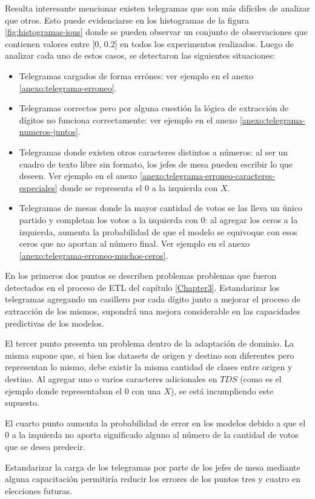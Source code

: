 Resulta interesante mencionar existen telegramas que son m\'as dif\'iciles de analizar que otros. Esto puede
evidenciarse en los histogramas de la figura \ref{fig:histogramas-ious} donde se pueden observar un conjunto de
observaciones que contienen valores entre [0, 0.2] en todos los experimentos realizados. Luego de analizar cada uno de
estos casos, se detectaron las siguientes situaciones:

\begin{itemize}
    \item Telegramas cargados de forma err\'ones: ver ejemplo en el anexo \ref{anexo:telegrama-erroneo}.
    \item Telegramas correctos pero por alguna cuesti\'on la l\'ogica de extracci\'on de d\'igitos no funciona correctamente: ver
          ejemplo en el anexo \ref{anexo:telegrama-numeros-juntos}.
    \item Telegramas donde existen otros caracteres distintos a n\'umeros: al ser un cuadro de texto libre sin formato, los jefes
          de mesa pueden escribir lo que deseen. Ver ejemplo en el anexo \ref{anexo:telegrama-erroneo-caracteres-especiales}
          donde se representa el $0$ a la izquierda con $X$.
    \item Telegramas de mesas donde la mayor cantidad de votos se las lleva un \'unico partido y completan los votos a la
          izquierda con $0$: al agregar los ceros a la izquierda, aumenta la probabilidad de que el modelo se equivoque con esos
          ceros que no aportan al n\'umero final. Ver ejemplo en el anexo \ref{anexo:telegrama-erroneo-muchos-ceros}.
\end{itemize}

En los primeros dos puntos se describen problemas problemas que fueron detectados en el proceso de ETL del cap\'itulo
\ref{Chapter3}. Estandarizar los telegramas agregando un casillero por cada d\'igito junto a mejorar el proceso de
extracci\'on de los mismos, supondr\'a una mejora considerable en las capacidades predictivas de los modelos.

El tercer punto presenta un problema dentro de la adaptaci\'on de dominio. La misma supone que, si bien los datasets de
origen y destino son diferentes pero representan lo mismo, debe existir la misma cantidad de clases entre origen y
destino. Al agregar uno o varios caracteres adicionales en $TDS$ (como es el ejemplo donde representaban el $0$ con una
$X$), se est\'a incumpliendo este supuesto.

El cuarto punto aumenta la probabilidad de error en los modelos debido a que el $0$ a la izquierda no aporta
significado alguno al n\'umero de la cantidad de votos que se desea predecir.

Estandarizar la carga de los telegramas por parte de los jefes de mesa mediante alguna capacitaci\'on permitir\'ia
reducir los errores de los puntos tres y cuatro en elecciones futuras.

